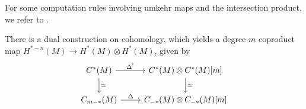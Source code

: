 \documentclass{scrartcl}
\theoremstyle{plain}
\newtheorem{proposition}[theorem]{Proposition}
\theoremstyle{definition}
\newcommand{\capp}{\mathbin{\frown}}
\newcommand{\cupp}{\mathbin{\smile}}
\newcommand{\quiso}{\simeq}
\let\xto\xrightarrow
\DeclareMathOperator{\id}{id}
\newcommand{\comp}{\mathbin{\circ}}
\begin{document}
For some computation rules involving umkehr maps and the intersection product, we refer to \cite[Prop. 14.1]{bredon2013topology}.


There is a dual construction on cohomology, which yields a degree $m$ coproduct map $H^{*-n}(M)\to H^*(M)\otimes H^*(M)$, given by 
\begin{equation}
    \begin{tikzcd}
        C^*(M) \dar["\quiso"]\rar["\Delta^!"] & C^*(M)\otimes C^*(M)[m] \dar["\quiso"]\\
        C_{m-*}(M)  \rar["\Delta"] & C_{-*}(M)\otimes C_{-*}(M)[m]
    \end{tikzcd}
\end{equation}
\end{document}
